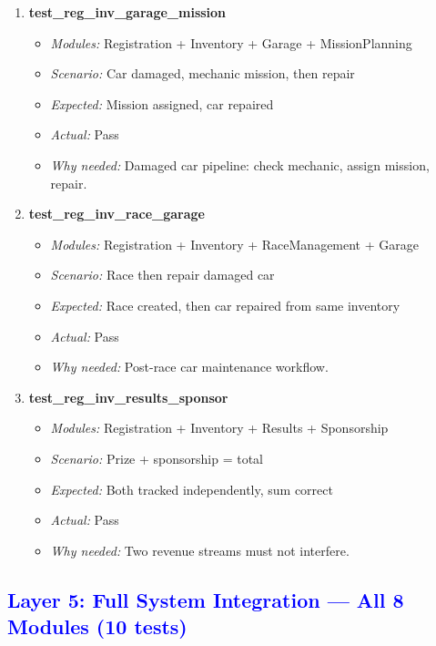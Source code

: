\documentclass{article}
\begin{document}
\begin{enumerate}[resume, label=\textbf{TC\arabic*.}]
\item \textbf{test\_reg\_inv\_garage\_mission}
\begin{itemize}[noitemsep]
  \item \textit{Modules:} Registration + Inventory + Garage + MissionPlanning
  \item \textit{Scenario:} Car damaged, mechanic mission, then repair
  \item \textit{Expected:} Mission assigned, car repaired
  \item \textit{Actual:} Pass
  \item \textit{Why needed:} Damaged car pipeline: check mechanic, assign mission, repair.
\end{itemize}

\item \textbf{test\_reg\_inv\_race\_garage}
\begin{itemize}[noitemsep]
  \item \textit{Modules:} Registration + Inventory + RaceManagement + Garage
  \item \textit{Scenario:} Race then repair damaged car
  \item \textit{Expected:} Race created, then car repaired from same inventory
  \item \textit{Actual:} Pass
  \item \textit{Why needed:} Post-race car maintenance workflow.
\end{itemize}

\item \textbf{test\_reg\_inv\_results\_sponsor}
\begin{itemize}[noitemsep]
  \item \textit{Modules:} Registration + Inventory + Results + Sponsorship
  \item \textit{Scenario:} Prize + sponsorship = total
  \item \textit{Expected:} Both tracked independently, sum correct
  \item \textit{Actual:} Pass
  \item \textit{Why needed:} Two revenue streams must not interfere.
\end{itemize}

\end{enumerate}


\subsection*{\textcolor{blue}{Layer 5: Full System Integration — All 8 Modules (10 tests)}}
\end{document}
